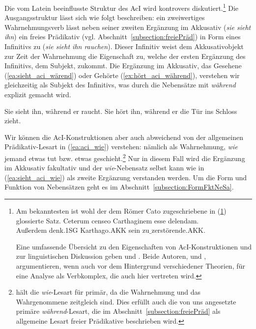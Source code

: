 Die vom Latein beeinflusste Struktur des AcI wird kontrovers diskutiert.\footnote{Am bekanntesten ist wohl der dem Römer Cato zugeschriebene in (\ref{ea:Cato}) glossierte Satz.
\ea\label{ea:Cato} 
\gll Ceterum censeo Carthaginem esse delendam. \\
Außerdem denk.1SG Karthago.AKK sein zu$\_$zerstörende.AKK.\\
\glt {}
\z 

Eine umfassende Übersicht zu den Eigenschaften von AcI-Konstruktionen und zur linguistischen Diskussion geben \citet[209--232]{Bausewein1990} und \citet[378--272]{MuellerLehrbuch4}. Beide Autoren, \citet[225--227]{Bausewein1990} und \citet[392]{MuellerLehrbuch4}, argumentieren, wenn auch vor dem Hintergrund verschiedener Theorien, für eine Analyse als Verbkomplex, die auch hier vertreten wird.} Die Ausgangsstruktur lässt sich wie folgt beschreiben: ein zweiwertiges Wahrnehmungsverb lässt neben seiner zweiten Ergänzung im Akkusativ (\textit{sie sieht ihn}) ein freies Prädikativ (vgl. Abschnitt~\ref{subsection:freiePräd}) in Form eines Infinitivs zu (\textit{sie sieht ihn rauchen}). Dieser Infinitiv weist dem Akkusativobjekt zur Zeit der Wahrnehmung die Eigenschaft zu, welche der ersten Ergänzung des Infinitivs, dem Subjekt, zukommt. Die Ergänzung im Akkusativ, das Gesehene (\ref{ea:sieht_aci_wärend}) oder Gehörte (\ref{ex:hört_aci_während}), verstehen wir gleichzeitig als Subjekt des Infinitivs, was durch die Nebensätze mit \textit{während} explizit gemacht wird.

\ea \label{ea:aci_wie}
\ea \label{ea:sieht_aci_wärend} Sie sieht ihn, während er raucht.
\ex \label{ex:hört_aci_während} Sie hört ihn, während er die Tür ins Schloss zieht.
\z 
\z 

Wir können die AcI-Konstruktionen aber auch abweichend von der allgemeinen Prädikativ-Lesart in (\ref{ea:aci_wie}) verstehen: nämlich als Wahrnehmung, \textit{wie} jemand etwas tut bzw. etwas geschieht.\footnote{\citet[394]{Eisenberg2020_Satz} hält die \textit{wie}-Lesart für primär, da die Wahrnehmung und das Wahrgenommene zeitgleich sind. Dies erfüllt auch die von uns angesetzte primäre \textit{während}-Lesart, die im Abschnitt~\ref{subsection:freiePräd} als allgemeine Lesart freier Prädikative beschrieben wird.} Nur in diesem Fall wird die Ergänzung im Akkusativ fakultativ und der \textit{wie}-Nebensatz selbst kann wie in (\ref{ea:sieht_aci_wie}) als zweite Ergänzung verstanden werden. Um die Form und Funktion von Nebensätzen geht es im Abschnitt~\ref{subsection:FormFktNeSa}.

